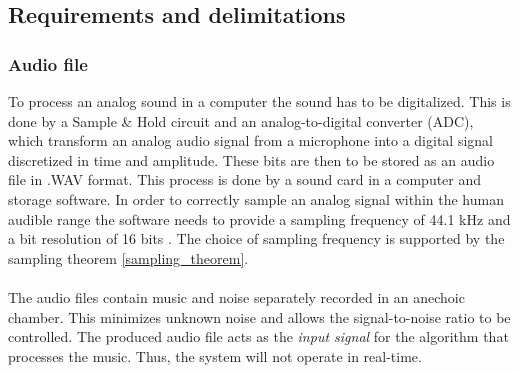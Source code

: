 \subsection{Requirements and delimitations}
\subsubsection{Audio file}
To process an analog sound in a computer the sound has to be digitalized. This is done by a Sample \& Hold circuit and an analog-to-digital converter (ADC), which transform an analog audio signal from a microphone into a digital signal discretized in time and amplitude. These bits are then to be stored as an audio file in .WAV format. This process is done by a sound card in a computer and storage software. In order to correctly sample an analog signal within the human audible range the software needs to provide a sampling frequency of 44.1 kHz and a bit resolution of 16 bits \cite{Mic}. The choice of sampling frequency is supported by the sampling theorem \ref{sampling_theorem}.\\\\
The audio files contain music and noise separately recorded in an anechoic chamber. This minimizes unknown noise and allows the signal-to-noise ratio to be controlled. The produced audio file acts as the \textit{input signal} for the algorithm that processes the music. Thus, the system will not operate in real-time. 

